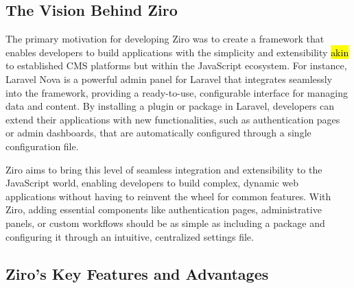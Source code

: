 \subsection*{The Vision Behind Ziro}

The primary motivation for developing Ziro was to create a framework that enables developers to build applications with the simplicity and extensibility \hl{akin} to established CMS platforms but within the JavaScript ecosystem. For instance, Laravel Nova is a powerful admin panel for Laravel that integrates seamlessly into the framework, providing a ready-to-use, configurable interface for managing data and content. By installing a plugin or package in Laravel, developers can extend their applications with new functionalities, such as authentication pages or admin dashboards, that are automatically configured through a single configuration file.

Ziro aims to bring this level of seamless integration and extensibility to the JavaScript world, enabling developers to build complex, dynamic web applications without having to reinvent the wheel for common features. With Ziro, adding essential components like authentication pages, administrative panels, or custom workflows should be as simple as including a package and configuring it through an intuitive, centralized settings file.

\subsection*{Ziro’s Key Features and Advantages}

